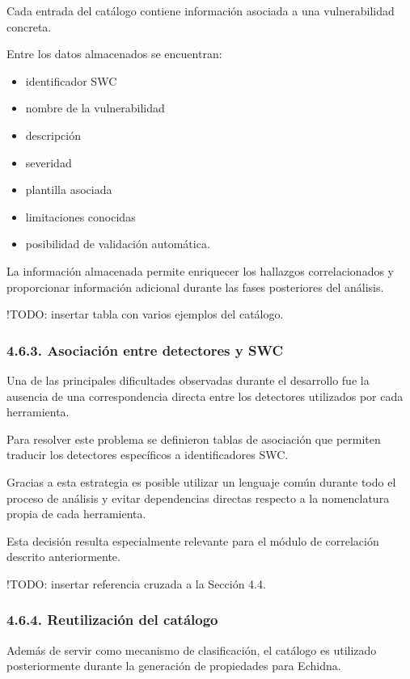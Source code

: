 Cada entrada del catálogo contiene información asociada a una
vulnerabilidad concreta.

Entre los datos almacenados se encuentran:

\begin{itemize}
\tightlist
\item
  identificador SWC
\item
  nombre de la vulnerabilidad
\item
  descripción
\item
  severidad
\item
  plantilla asociada
\item
  limitaciones conocidas
\item
  posibilidad de validación automática.
\end{itemize}

La información almacenada permite enriquecer los hallazgos
correlacionados y proporcionar información adicional durante las fases
posteriores del análisis.

!TODO: insertar tabla con varios ejemplos del catálogo.

\subsubsection{4.6.3. Asociación entre detectores y
SWC}\label{asociaciuxf3n-entre-detectores-y-swc}

Una de las principales dificultades observadas durante el desarrollo fue
la ausencia de una correspondencia directa entre los detectores
utilizados por cada herramienta.

Para resolver este problema se definieron tablas de asociación que
permiten traducir los detectores específicos a identificadores SWC.

Gracias a esta estrategia es posible utilizar un lenguaje común durante
todo el proceso de análisis y evitar dependencias directas respecto a la
nomenclatura propia de cada herramienta.

Esta decisión resulta especialmente relevante para el módulo de
correlación descrito anteriormente.

!TODO: insertar referencia cruzada a la Sección 4.4.

\subsubsection{4.6.4. Reutilización del
catálogo}\label{reutilizaciuxf3n-del-catuxe1logo}

Además de servir como mecanismo de clasificación, el catálogo es
utilizado posteriormente durante la generación de propiedades para
Echidna.


